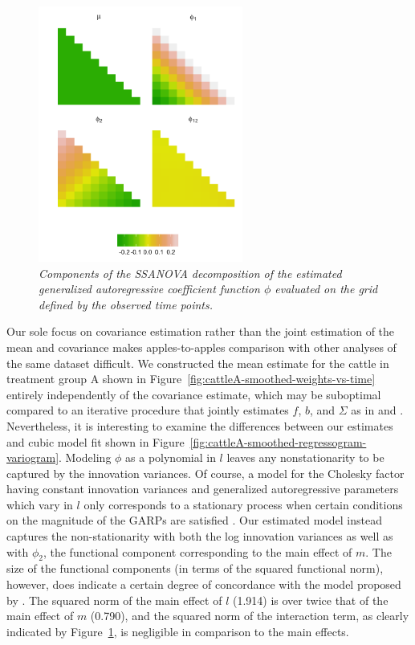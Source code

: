 %
\begin{figure}[H] 
\centering
  \includegraphics[width = 0.6\textwidth]{img/chapter-5/cattle-ssanova-estimate-lattice} 
  \caption{\textit{Components of the SSANOVA decomposition of the estimated generalized autoregressive coefficient function $\phi$ evaluated on the grid defined by the observed time points.}}\label{fig:cattle-fitted-cholesky-ssanova}
\end{figure}


Our sole focus on covariance estimation rather than the joint estimation of the mean and covariance makes apples-to-apples comparison with other analyses of the same dataset difficult. We constructed the mean estimate for the cattle in treatment group A shown in Figure~\ref{fig:cattleA-smoothed-weights-vs-time} entirely independently of the covariance estimate, which may be suboptimal compared to an iterative procedure that jointly estimates $f$, $b$, and $\Sigma$ as in \cite{pan2017jmcm} and \cite{pourahmadi1999joint}. Nevertheless, it is interesting to examine the differences between our estimates and cubic model fit shown in Figure~\ref{fig:cattleA-smoothed-regressogram-variogram}. Modeling $\phi$ as a polynomial in $l$ leaves any nonstationarity to be captured by the innovation variances. Of course, a model for the Cholesky factor having constant innovation variances and generalized autoregressive parameters which vary in $l$ only corresponds to a stationary process when certain conditions on the magnitude of the GARPs are satisfied \citep{klein1997statistical,madsen2007time}. Our estimated model instead captures the non-stationarity with both the log innovation variances as well as with $\phi_2$, the functional component corresponding to the main effect of $m$. The size of the functional components (in terms of the squared functional norm), however, does indicate a certain degree of concordance with the model proposed by \cite{pourahmadi1999joint}. The squared norm of the main effect of $l$ (1.914) is over twice that of the main effect of $m$ (0.790), and the squared norm of the interaction term, as clearly indicated by Figure~\ref{fig:cattle-fitted-cholesky-ssanova}, is negligible in comparison to the main effects.



%
%
%
